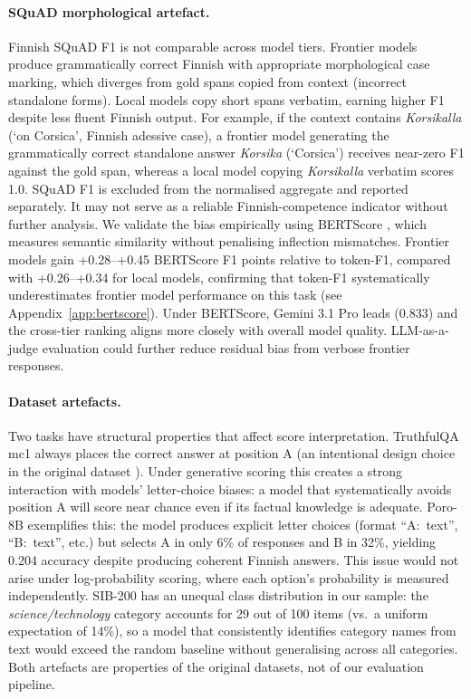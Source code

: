 \documentclass[11pt]{article}
\begin{document}
\paragraph{SQuAD morphological artefact.}
\label{sec:squad}
Finnish SQuAD F1 is not comparable across model tiers.
Frontier models produce grammatically correct Finnish with appropriate
morphological case marking, which diverges from gold spans copied from
context (incorrect standalone forms).
Local models copy short spans verbatim, earning higher F1 despite
less fluent Finnish output.
For example, if the context contains \textit{Korsikalla}
(`on Corsica', Finnish adessive case), a frontier model generating
the grammatically correct standalone answer \textit{Korsika}
(`Corsica') receives near-zero F1 against the gold span, whereas a
local model copying \textit{Korsikalla} verbatim scores 1.0.
SQuAD F1 is excluded from the normalised aggregate and reported separately.
It may not serve as a reliable Finnish-competence indicator without
further analysis.
We validate the bias empirically using BERTScore \cite{zhang2020bertscore}, which measures semantic similarity
without penalising inflection mismatches.
Frontier models gain +0.28--+0.45 BERTScore F1 points relative to token-F1,
compared with +0.26--+0.34 for local models, confirming that token-F1
systematically underestimates frontier model performance on this task
(see Appendix~\ref{app:bertscore}).
Under BERTScore, Gemini 3.1 Pro leads (0.833) and the cross-tier ranking
aligns more closely with overall model quality.
LLM-as-a-judge evaluation could further reduce residual bias from
verbose frontier responses.

\paragraph{Dataset artefacts.}
Two tasks have structural properties that affect score interpretation.
TruthfulQA mc1 always places the correct answer at position A
(an intentional design choice in the original dataset \cite{lin2022truthfulqa}).
Under generative scoring this creates a strong interaction with models'
letter-choice biases: a model that systematically avoids position A will
score near chance even if its factual knowledge is adequate.
Poro-8B exemplifies this: the model produces explicit letter choices
(format ``A:~text'', ``B:~text'', etc.) but selects A in only 6\% of
responses and B in 32\%, yielding 0.204 accuracy despite producing
coherent Finnish answers.
This issue would not arise under log-probability scoring, where each option's
probability is measured independently.
SIB-200 has an unequal class distribution in our sample: the
\textit{science/technology} category accounts for 29 out of 100 items
(vs.\ a uniform expectation of 14\%), so a model that consistently
identifies category names from text would exceed the random baseline
without generalising across all categories.
Both artefacts are properties of the original datasets, not of our
evaluation pipeline.
\end{document}
